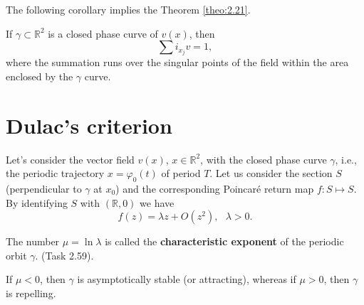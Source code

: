The following corollary implies the Theorem \ref{theo:2.21}.

\begin{corollary}
	If $ \gamma \subset \mathbb {R} ^ {2} $ is a closed phase curve of $ v (x) $, then
	$$
	\sum i_{x_{j}}v=1,
	$$
	where the summation runs over the singular points of the field within the area enclosed by the $ \gamma $ curve.
\end{corollary}

\section{Dulac's criterion}

Let's consider the vector field $ v (x) $, $ x \in \mathbb {R} ^ {2} $, with the closed phase curve $ \gamma $, i.e., the periodic trajectory $ x = \varphi _ {0} (t) $ of period $ T $. Let us consider the section $ S $ (perpendicular to $ \gamma $ at $ x_ {0}$) and the corresponding Poincaré return map $ f: S \longmapsto S $. By identifying $S$ with $\left( \mathbb{R}, 0\right) $ we have
$$
f(z)=\lambda z+O(z^{2}),\text{ \ \ }\lambda >0.
$$

\begin{definition}\label{def:2.27}
	The number $\mu =\ln \lambda $ is called the \textbf{characteristic exponent} of the periodic orbit $ \gamma $. (Task 2.59).
\end{definition}

\begin{remark}
	If $\mu <0$, then $\gamma$ is asymptotically stable (or attracting), whereas if $\mu >0$, then $\gamma$ is repelling.
\end{remark}

